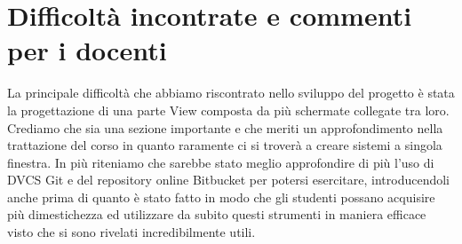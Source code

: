 \documentclass[a4paper,12pt]{report}
\begin{document}
\section{Difficoltà incontrate e commenti per i docenti}
La principale difficoltà che abbiamo riscontrato nello sviluppo del progetto è stata la progettazione di una parte View composta da più schermate collegate tra loro. Crediamo che sia una sezione importante e che meriti un approfondimento nella trattazione del corso in quanto raramente ci si troverà a creare sistemi a singola finestra. 
In più riteniamo che sarebbe stato meglio approfondire di più l'uso di DVCS Git e del repository online Bitbucket per potersi esercitare, introducendoli anche prima di quanto è stato fatto in modo che gli studenti possano acquisire più dimestichezza ed utilizzare da subito questi strumenti in maniera efficace visto che si sono rivelati incredibilmente utili.
\end{document}
